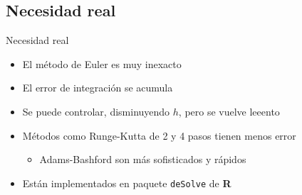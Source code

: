 \documentclass[
  11pt,
  ignorenonframetext,
]{beamer}
\providecommand{\tightlist}{%
  \setlength{\itemsep}{0pt}\setlength{\parskip}{0pt}}
\begin{document}
\hypertarget{necesidad-real-1}{%
\subsection{Necesidad real}\label{necesidad-real-1}}

\begin{frame}[fragile]{Necesidad real}
\begin{itemize}
\item
  El método de Euler es muy inexacto
\item
  El error de integración se acumula
\item
  Se puede controlar, disminuyendo \(h\), pero se vuelve leeento
\item
  Métodos como Runge-Kutta de 2 y 4 pasos tienen menos error

  \begin{itemize}
  \tightlist
  \item
    Adams-Bashford son más sofisticados y rápidos
  \end{itemize}
\item
  Están implementados en paquete \texttt{deSolve} de \textbf{R}
\end{itemize}
\end{frame}
\end{document}
